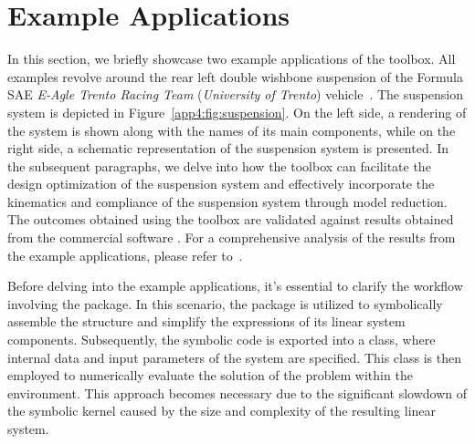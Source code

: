 
\section{Example Applications}
\label{app4:sec:example_applications}

In this section, we briefly showcase two example applications of the \TrussMe{} toolbox. All examples revolve around the rear left double wishbone suspension of the Formula SAE \emph{E-Agle Trento Racing Team} (\emph{University of Trento}) vehicle~\citep{eagle}. The suspension system is depicted in Figure~\ref{app4:fig:suspension}. On the left side, a rendering of the system is shown along with the names of its main components, while on the right side, a schematic representation of the suspension system is presented. In the subsequent paragraphs, we delve into how the \TrussMe{} toolbox can facilitate the design optimization of the suspension system and effectively incorporate the kinematics and compliance of the suspension system through model reduction. The outcomes obtained using the \TrussMe{} toolbox are validated against results obtained from the commercial software \Ansys{}. For a comprehensive analysis of the results from the example applications, please refer to~\cite{larcher2024symbolic}.

Before delving into the example applications, it's essential to clarify the workflow involving the \TrussMe{} package. In this scenario, the \TrussMe{} package is utilized to symbolically assemble the structure and simplify the expressions of its linear system components. Subsequently, the symbolic code is exported into a \Matlab{} class, where internal data and input parameters of the system are specified. This \Matlab{} class is then employed to numerically evaluate the solution of the problem within the \Simulink{} environment. This approach becomes necessary due to the significant slowdown of the symbolic kernel caused by the size and complexity of the resulting linear system.

